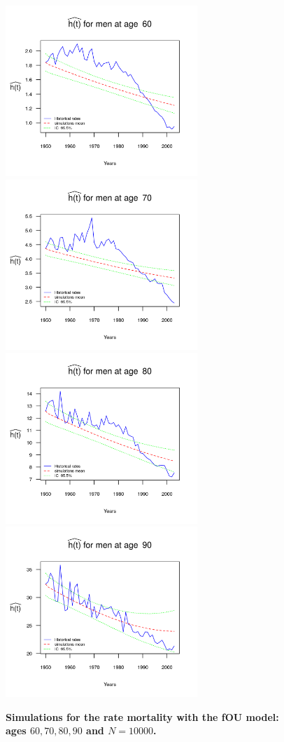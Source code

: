 \documentclass[smallextended]{svjour3}
\begin{document}
\begin{figure}[H]
    \includegraphics[width = 2.85in]{PlotMen60.png}
    \includegraphics[width = 2.85in]{PlotMen70.png}
    \includegraphics[width = 2.85in]{PlotMen80.png}
    \includegraphics[width = 2.85in]{PlotMen90.png}
    \caption{\bf Simulations for the rate mortality with the fOU model: ages
    $60,70,80,90$ and $N=10000$.}
    \label{graph-simu_FOU4}
\end{figure}\vspace*{0.1cm}
\end{document}
